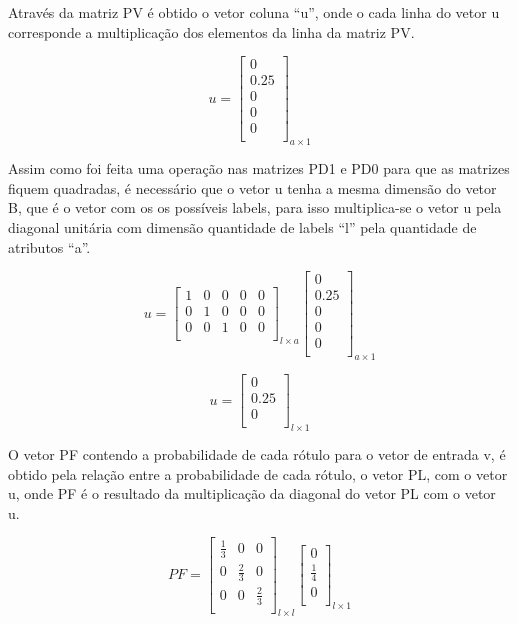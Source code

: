 Através da matriz PV é obtido o vetor coluna ``u'', onde o cada linha
do vetor u corresponde a multiplicação dos elementos da linha da matriz
PV.

$$u=\left[
\begin{array}{c}
0 \\
0.25 \\
0 \\
0 \\
0 \\
\end{array}
\right]_{a \times 1}$$

Assim como foi feita uma operação nas matrizes PD1 e PD0 para que as
matrizes fiquem quadradas, é necessário que o vetor u tenha a mesma
dimensão do vetor B, que é o vetor com os os possíveis labels, para
isso multiplica-se o vetor u pela diagonal unitária com dimensão
quantidade de labels ``l'' pela quantidade de atributos ``a''.

$$u=\left[
\begin{array}{ccccc}
1 & 0 & 0 & 0 & 0 \\
0 & 1 & 0 & 0 & 0 \\
0 & 0 & 1 & 0 & 0 \\
\end{array}
\right]_{l \times a}
\left[
\begin{array}{c}
0 \\
0.25 \\
0 \\
0 \\
0 \\
\end{array}
\right]_{a \times 1}
$$

$$u=\left[
\begin{array}{c}
0 \\
0.25 \\
0 \\
\end{array}
\right]_{l \times 1}
$$

O vetor PF contendo a probabilidade de cada rótulo para o vetor de
entrada v, é obtido pela relação entre a probabilidade de cada rótulo,
o vetor PL, com o vetor u, onde PF é o resultado da multiplicação da
diagonal do vetor PL com o vetor u.

$$PF=\left[
\begin{array}{ccccc}
\frac{1}{3} & 0 & 0 \\
0 & \frac{2}{3} & 0 \\
0 & 0 & \frac{2}{3} \\
\end{array}
\right]_{l \times l}
\left[
\begin{array}{c}
0 \\
\frac{1}{4} \\
0 \\
\end{array}
\right]_{l \times 1}
$$

